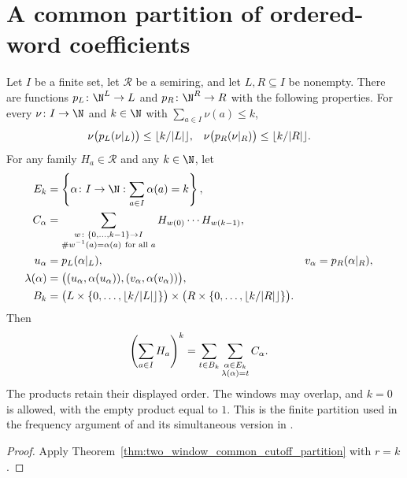 \section{A common partition of ordered-word coefficients}

\begin{theorem}
    \label{thm:two_window_word_coefficient_partition}
    \leanok
    Let $I$ be a finite set, let $\mathcal R$ be a semiring, and let
    $L,R\subseteq I$ be nonempty.
    There are functions $p_L\colon\N^L\to L$ and $p_R\colon\N^R\to R$
    with the following properties. For every $\nu\colon I\to\N$ and
    $k\in\N$ with $\sum_{a\in I}\nu(a)\le k$,
    \begin{align}
        \nu\bigl(p_L(\nu|_L)\bigr) & \le\lfloor k/|L|\rfloor,
                                   & \nu\bigl(p_R(\nu|_R)\bigr) & \le\lfloor k/|R|\rfloor.\notag
    \end{align}
    For any family $H_a\in\mathcal R$ and any $k\in\N$, let
    \begin{align}
        E_k             & =\left\{\alpha\colon I\to\N:\sum_{a\in I}\alpha(a)=k\right\},
        \notag                                                                                                   \\
        C_\alpha        & =\sum_{\substack{w\colon\{0,\ldots,k-1\}\to I                                          \\
                \#w^{-1}(a)=\alpha(a)\ \text{for all }a}}
        H_{w(0)}\cdots H_{w(k-1)},\notag                                                                         \\
        u_\alpha        & =p_L(\alpha|_L),
                        & v_\alpha                                                      & =p_R(\alpha|_R),\notag \\
        \lambda(\alpha) & =\bigl((u_\alpha,\alpha(u_\alpha)),
        (v_\alpha,\alpha(v_\alpha))\bigr),\notag                                                                 \\
        B_k             & =\bigl(L\times\{0,\ldots,\lfloor k/|L|\rfloor\}\bigr)
        \times\bigl(R\times\{0,\ldots,\lfloor k/|R|\rfloor\}\bigr).
        \notag
    \end{align}
    Then
    \begin{align}
        \left(\sum_{a\in I}H_a\right)^k
         & =\sum_{t\in B_k}
        \sum_{\substack{\alpha\in E_k \\\lambda(\alpha)=t}}C_\alpha.
        \notag
    \end{align}
    The products retain their displayed order. The windows may overlap,
    and $k=0$ is allowed, with the empty product equal to $1$.
    This is the finite partition used in the
    frequency argument of \cite[Lemma~4.2]{Arad2013AreaLaw} and its
    simultaneous version in \cite[Proposition~5.7]{Arad2016RigorousRG}.
\end{theorem}
\begin{proof}\leanok
    Apply Theorem~\ref{thm:two_window_common_cutoff_partition} with $r=k$.
\end{proof}


